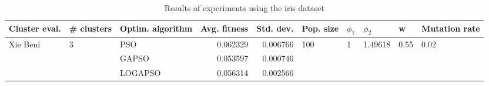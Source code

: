\begin{table}
\centering
\caption{Results of experiments using the iris dataset}
\begin{tabular}{lllrrlllll}
\toprule
            Cluster eval. &        \# clusters & Optim. algorithm &  Avg. fitness &  Std. dev. &            Pop. size &         $\phi_{1}$ &               $\phi_{2}$ &                     w &         Mutation rate \\
\midrule
\multirow{3}{*}{Xie Beni} & \multirow{3}{*}{3} &              PSO &      0.062329 &   0.006766 & \multirow{3}{*}{100} & \multirow{3}{*}{1} & \multirow{3}{*}{1.49618} & \multirow{3}{*}{0.55} & \multirow{3}{*}{0.02} \\
                          &                    &            GAPSO &      0.053597 &   0.000746 &                      &                    &                          &                       &                       \\
                          &                    &          LOGAPSO &      0.056314 &   0.002566 &                      &                    &                          &                       &                       \\
\bottomrule
\end{tabular}
\end{table}
